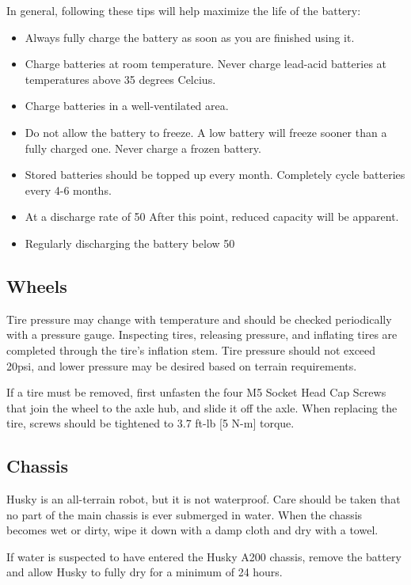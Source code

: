 \documentclass[]{clearpath-latex/clearpath-manual}
\begin{document}
In general, following these tips will help maximize the life of the battery:

\begin{itemize}
	\item Always fully charge the battery as soon as you are finished using it.
	\item Charge batteries at room temperature.  Never charge lead-acid batteries at temperatures above 35 degrees Celcius.
	\item Charge batteries in a well-ventilated area.
	\item Do not allow the battery to freeze.  A low battery will freeze sooner than a fully charged one.  Never charge a frozen battery.
	\item Stored batteries should be topped up every month.  Completely cycle batteries every 4-6 months.
	\item At a discharge rate of 50%
	After this point, reduced capacity will be apparent.
	\item Regularly discharging the battery below 50%
\end{itemize}

\subsection{Wheels}
Tire pressure may change with temperature and should be checked periodically with a pressure gauge.
Inspecting tires, releasing pressure, and inflating tires are completed through the tire’s inflation stem.
Tire pressure should not exceed 20psi, and lower pressure may be desired based on terrain requirements.

If a tire must be removed, first unfasten the four M5 Socket Head Cap Screws that join the wheel to the axle hub,
and slide it off the axle. When replacing the tire, screws should be tightened to 3.7 ft-lb [5 N-m] torque.

\subsection{Chassis}
Husky is an all-terrain robot, but it is not waterproof. Care should be taken that no part of the main
chassis is ever submerged in water. When the chassis becomes wet or dirty, wipe it down with a damp cloth
and dry with a towel.

If water is suspected to have entered the Husky A200 chassis, remove the battery and allow Husky to fully dry for a minimum of 24 hours.
\end{document}
